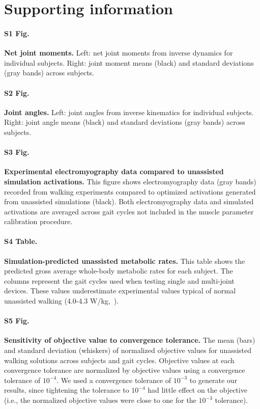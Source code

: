 \documentclass[10pt,letterpaper]{article}
\begin{document}
\section*{Supporting information}

\paragraph*{S1 Fig.}
\label{S1_Fig}
{\bf Net joint moments.} Left: net joint moments from inverse dynamics for individual subjects. Right: joint moment means (black) and standard deviations (gray bands) across subjects.

\paragraph*{S2 Fig.}
\label{S2_Fig}
{\bf Joint angles.} Left: joint angles from inverse kinematics for individual subjects. Right: joint angle means (black) and standard deviations (gray bands) across subjects.

\paragraph*{S3 Fig.}
\label{S3_Fig}
{\bf Experimental electromyography data compared to unassisted simulation activations.} This figure shows electromyography data (gray bands) recorded from walking experiments compared to optimized activations generated from unassisted simulations (black). Both electromyography data and simulated activations are averaged across gait cycles not included in the muscle parameter calibration procedure.

\paragraph*{S4 Table.}
\label{S4_Table}
{\bf Simulation-predicted unassisted metabolic rates.} This table shows the predicted gross average whole-body metabolic rates for each subject. The columns represent the gait cycles used when testing single and multi-joint devices. These values underestimate experimental values typical of normal unassisted walking (4.0-4.3 W/kg,~\cite{Waters:1999}).

\paragraph*{S5 Fig.}
\label{S5_Fig}
{\bf Sensitivity of objective value to convergence tolerance.} The mean (bars) and standard deviation (whiskers) of normalized objective values for unassisted walking solutions across subjects and gait cycles. Objective values at each convergence tolerance are normalized by objective values using a convergence tolerance of $10^{-4}$. We used a convergence tolerance of $10^{-3}$ to generate our results, since tightening the tolerance to $10^{-4}$ had little effect on the objective (i.e., the normalized objective values were close to one for the $10^{-3}$ tolerance).
\end{document}
